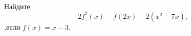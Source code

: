 \begin{ex}
	\begin{condition}
		Найдите \[ 2f^2(x)-f(2x)-2(x^2-7x), \],\quad если \( f(x)=x-3 \).
	\end{condition}
\end{ex}